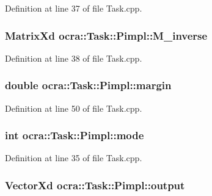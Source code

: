 Definition at line 37 of file Task.\+cpp.

\subsubsection[{\texorpdfstring{M\+\_\+inverse}{M_inverse}}]{\setlength{\rightskip}{0pt plus 5cm}Matrix\+Xd ocra\+::\+Task\+::\+Pimpl\+::\+M\+\_\+inverse}\hypertarget{structocra_1_1Task_1_1Pimpl_ac90e5b26fe9913da7926db938a8163fc}{}\label{structocra_1_1Task_1_1Pimpl_ac90e5b26fe9913da7926db938a8163fc}


Definition at line 38 of file Task.\+cpp.

\subsubsection[{\texorpdfstring{margin}{margin}}]{\setlength{\rightskip}{0pt plus 5cm}double ocra\+::\+Task\+::\+Pimpl\+::margin}\hypertarget{structocra_1_1Task_1_1Pimpl_a8e92bd559918e4b01bcd235ad9e40a3a}{}\label{structocra_1_1Task_1_1Pimpl_a8e92bd559918e4b01bcd235ad9e40a3a}


Definition at line 50 of file Task.\+cpp.

\subsubsection[{\texorpdfstring{mode}{mode}}]{\setlength{\rightskip}{0pt plus 5cm}int ocra\+::\+Task\+::\+Pimpl\+::mode}\hypertarget{structocra_1_1Task_1_1Pimpl_a634149661255498ea67c10750174ec62}{}\label{structocra_1_1Task_1_1Pimpl_a634149661255498ea67c10750174ec62}


Definition at line 35 of file Task.\+cpp.

\subsubsection[{\texorpdfstring{output}{output}}]{\setlength{\rightskip}{0pt plus 5cm}Vector\+Xd ocra\+::\+Task\+::\+Pimpl\+::output}\hypertarget{structocra_1_1Task_1_1Pimpl_a744ec0ed0ff3032105be593b86e7eb61}{}\label{structocra_1_1Task_1_1Pimpl_a744ec0ed0ff3032105be593b86e7eb61}



